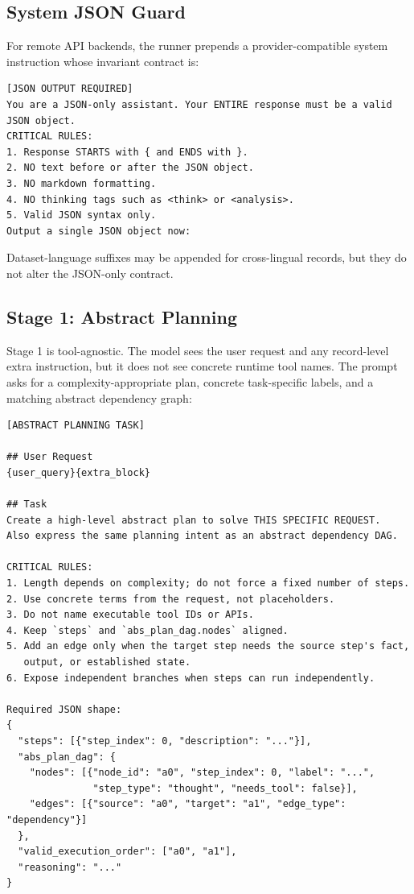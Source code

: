 \documentclass{article}
\begin{document}
\subsection{System JSON Guard}
\label{subsec:appendix-system-prompt}

For remote API backends, the runner prepends a provider-compatible system
instruction whose invariant contract is:

\begin{lstlisting}
[JSON OUTPUT REQUIRED]
You are a JSON-only assistant. Your ENTIRE response must be a valid JSON object.
CRITICAL RULES:
1. Response STARTS with { and ENDS with }.
2. NO text before or after the JSON object.
3. NO markdown formatting.
4. NO thinking tags such as <think> or <analysis>.
5. Valid JSON syntax only.
Output a single JSON object now:
\end{lstlisting}

Dataset-language suffixes may be appended for cross-lingual records, but they do
not alter the JSON-only contract.

\subsection{Stage 1: Abstract Planning}
\label{subsec:appendix-stage1}

Stage 1 is tool-agnostic. The model sees the user request and any record-level
extra instruction, but it does not see concrete runtime tool names. The prompt
asks for a complexity-appropriate plan, concrete task-specific labels, and a
matching abstract dependency graph:

\begin{lstlisting}
[ABSTRACT PLANNING TASK]

## User Request
{user_query}{extra_block}

## Task
Create a high-level abstract plan to solve THIS SPECIFIC REQUEST.
Also express the same planning intent as an abstract dependency DAG.

CRITICAL RULES:
1. Length depends on complexity; do not force a fixed number of steps.
2. Use concrete terms from the request, not placeholders.
3. Do not name executable tool IDs or APIs.
4. Keep `steps` and `abs_plan_dag.nodes` aligned.
5. Add an edge only when the target step needs the source step's fact,
   output, or established state.
6. Expose independent branches when steps can run independently.

Required JSON shape:
{
  "steps": [{"step_index": 0, "description": "..."}],
  "abs_plan_dag": {
    "nodes": [{"node_id": "a0", "step_index": 0, "label": "...",
               "step_type": "thought", "needs_tool": false}],
    "edges": [{"source": "a0", "target": "a1", "edge_type": "dependency"}]
  },
  "valid_execution_order": ["a0", "a1"],
  "reasoning": "..."
}
\end{lstlisting}
\end{document}
